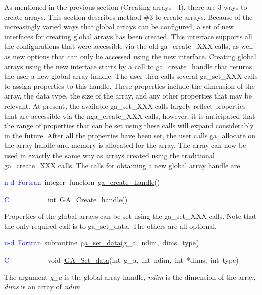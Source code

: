 As mentioned in the previous section (\textquotedbl{}Creating arrays
- I\textquotedbl{}), there are 3 ways to create arrays. This section
describes method \#3 to create arrays. Because of the increasingly
varied ways that global arrays can be configured, a set of new interfaces
for creating global arrays has been created. This interface supports
all the configurations that were accessible via the old ga\_create\_XXX
calls, as well as new options that can only be accessed using the
new interface. Creating global arrays using the new interface starts
by a call to ga\_create\_handle that returns the user a new global
array handle. The user then calls several ga\_set\_XXX calls to assign
properties to this handle. These properties include the dimension
of the array, the data type, the size of the array, and any other
properties that may be relevant. At present, the available ga\_set\_XXX
calls largely reflect properties that are accessible via the nga\_create\_XXX
calls, however, it is anticipated that the range of properties that
can be set using these calls will expand considerably in the future.
After all the properties have been set, the user calls ga\_allocate
on the array handle and memory is allocated for the array. The array
can now be used in exactly the same way as arrays created using the
traditional ga\_create\_XXX calls. The calls for obtaining a new global
array handle are
\begin{lyxcode}
\textcolor{blue}{n-d~Fortran}~integer~function~\href{http://www.emsl.pnl.gov/docs/global/ga_ops.html\#NGA_CREATE_HANDLE}{ga\_{}create\_{}handle}()~

\textcolor{blue}{C}~~~~~~~~~~~int~\href{http://www.emsl.pnl.gov/docs/global/c_nga_ops.html\#GA_CREATE_HANDLE}{GA\_{}Create\_{}handle}()
\end{lyxcode}
Properties of the global arrays can be set using the ga\_set\_XXX
calls. Note that the only required call is to ga\_set\_data. The others
are all optional.
\begin{lyxcode}
\textcolor{blue}{n-d~Fortran}~subroutine~\href{http://www.emsl.pnl.gov/docs/global/ga_ops.html\#NGA_SET_DATA}{ga\_{}set\_{}data}(g\_a,~ndim,~dims,~type)~

\textcolor{blue}{C}~~~~~~~~~~~void~\href{http://www.emsl.pnl.gov/docs/global/c_nga_ops.html\#GA_SET_DATA}{GA\_{}Set\_{}data}(int~g\_a,~int~ndim,~int~{*}dims,~int~type)
\end{lyxcode}
The argument \emph{g\_a} is the global array handle, \emph{ndim} is
the dimension of the array, \emph{dims} is an array of \emph{ndim}
